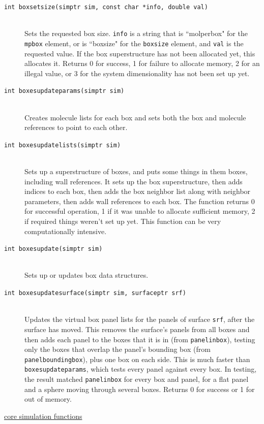 \documentclass {scrbook}
\newcommand {\ttt} {\texttt}
\begin{document}
\begin{description}
\item[\ttt{int boxsetsize(simptr sim, const char *info, double val)}]
\hfill \\
Sets the requested box size. \ttt{info} is a string that is ``molperbox" for the \ttt{mpbox} element, or is ``boxsize" for the \ttt{boxsize} element, and \ttt{val} is the requested value. If the box superstructure has not been allocated yet, this allocates it. Returns 0 for success, 1 for failure to allocate memory, 2 for an illegal value, or 3 for the system dimensionality has not been set up yet.

\item[\ttt{int boxesupdateparams(simptr sim)}]
\hfill \\
Creates molecule lists for each box and sets both the box and molecule references to point to each other.

\item[\ttt{int boxesupdatelists(simptr sim)}]
\hfill \\
Sets up a superstructure of boxes, and puts some things in them boxes, including wall references. It sets up the box superstructure, then adds indices to each box, then adds the box neighbor list along with neighbor parameters, then adds wall references to each box. The function returns 0 for successful operation, 1 if it was unable to allocate sufficient memory, 2 if required things weren't set up yet. This function can be very computationally intensive.

\item[\ttt{int boxesupdate(simptr sim)}]
\hfill \\
Sets up or updates box data structures.

\item[\ttt{int boxesupdatesurface(simptr sim, surfaceptr srf)}]
\hfill \\
Updates the virtual box panel lists for the panels of surface \ttt{srf}, after the surface has moved. This removes the surface's panels from all boxes and then adds each panel to the boxes that it is in (from \ttt{panelinbox}), testing only the boxes that overlap the panel's bounding box (from \ttt{panelboundingbox}), plus one box on each side. This is much faster than \ttt{boxesupdateparams}, which tests every panel against every box. In testing, the result matched \ttt{panelinbox} for every box and panel, for a flat panel and a sphere moving through several boxes. Returns 0 for success or 1 for out of memory.

\item[\underline{core simulation functions}]


\end{description}
\end{document}
